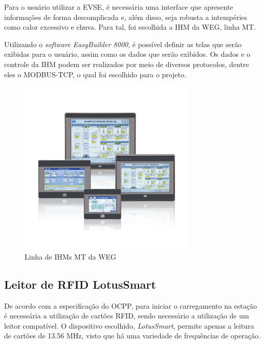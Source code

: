 Para o usuário utilizar a \ac{EVSE}, é necessária uma interface que apresente informações de forma descomplicada e, além disso, seja robusta a intempéries como calor excessivo e chuva. Para tal, foi escolhida a \ac{IHM} da WEG, linha MT.

Utilizando o \textit{software EasyBuilder 8000}, é possível definir as telas que serão exibidas para o usuário, assim como os dados que serão exibidos. Os dados e o controle da IHM podem ser realizados por meio de diversos protocolos, dentre eles o MODBUS-TCP, o qual foi escolhido para o projeto.

\begin{figure}[H]
        \begin{center}
                \includegraphics[width=0.75\textwidth,natwidth=400,natheight=288]{assets/images/devices-hmi.jpg}
                \caption{Linha de IHMs MT da WEG}
                \label{fig:ihm}
        \end{center}
\end{figure}

\subsection{Leitor de RFID LotusSmart}

De acordo com a especificação do \ac{OCPP}, para iniciar o carregamento na estação é necessária a utilização de cartões \ac{RFID}, sendo necessário a utilização de um leitor compatível. O dispositivo escolhido, \textit{LotusSmart}, permite apenas a leitura de cartões de 13.56 MHz, visto que há uma variedade de frequências de operação.

